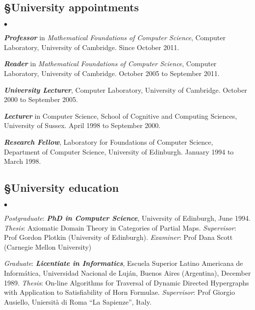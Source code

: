 \documentclass[11pt,twocolumn]{article}
\newenvironment{myitemize}
  {\begin{list}{$\bullet$}
  {\setlength{\topsep}{1pt}
   \setlength{\partopsep}{1pt}
   \setlength{\itemsep}{0pt}
   \setlength{\parsep}{0pt}
   \setlength{\leftmargin}{1em}
   \setlength{\labelwidth}{.5em}}}
  {\end{list}}
\begin{document}
\subsection*{\S\enspace\thinspace University appointments}

\begin{myitemize}
\item
\textbf{\em Professor} in \emph{Mathematical Foundations of Computer
Science},  Computer Laboratory, University of Cambridge.  Since October
2011.

\item
\textbf{\em Reader} in \emph{Mathematical Foundations of Computer
Science}, Computer Laboratory, University of Cambridge.  October 2005 to
September 2011.

\item
\textbf{\em University Lecturer}, Computer Laboratory, University of
Cambridge.  October 2000 to September 2005.

\item
\textbf{\em Lecturer} in Computer Science, School of Cognitive and
Computing Sciences, University of Sussex.  April 1998 to September 2000. 

\item
\textbf{\em Research Fellow}, Laboratory for Foundations of Computer
Science, Department of Computer Science, University of Edinburgh.  January
1994 to March 1998.
\end{myitemize}

\subsection*{\S\enspace\thinspace University education}

\begin{myitemize}
\item
{\em Postgraduate}: \textbf{\em PhD in Computer Science}, University of
Edinburgh, June 1994.  \emph{Thesis}: Axiomatic Domain Theory in
Categories of Partial Maps.  \emph{Supervisor}: Prof Gordon Plotkin
(University of Edinburgh).  \emph{Examiner}: Prof Dana Scott (Carnegie
Mellon University)

\item
{\em Graduate}: \textbf{\em Licentiate in Informatics}, Escuela Superior
Latino Americana de Inform\'atica, Universidad Nacional de Luj\'an, Buenos
Aires (Argentina), December 1989.  \emph{Thesis}: On-line Algorithms for
Traversal of Dynamic Directed Hypergraphs with Application to
Satisfiability of Horn Formulae.  \emph{Supervisor}: Prof Giorgio
Ausiello, Uniersit\`a di Roma ``La Sapienze'', Italy.
\end{myitemize}
\end{document}
